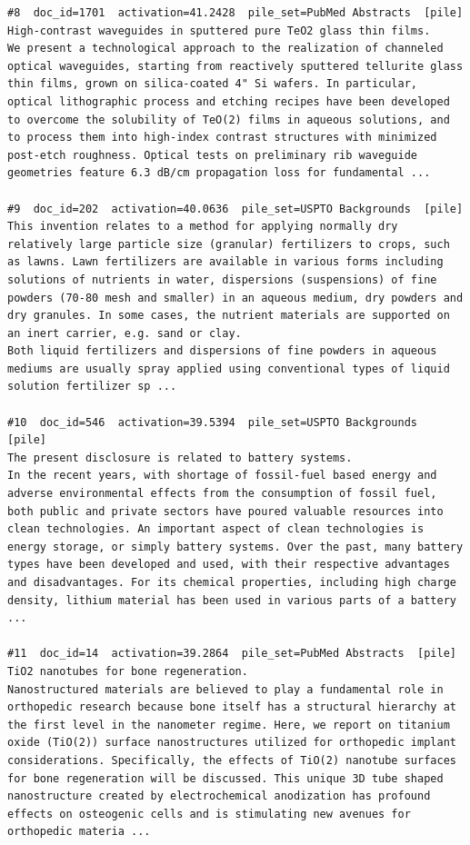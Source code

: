 \begin{verbatim}
#8  doc_id=1701  activation=41.2428  pile_set=PubMed Abstracts  [pile]
High-contrast waveguides in sputtered pure TeO2 glass thin films.
We present a technological approach to the realization of channeled optical waveguides, starting from reactively sputtered tellurite glass thin films, grown on silica-coated 4" Si wafers. In particular, optical lithographic process and etching recipes have been developed to overcome the solubility of TeO(2) films in aqueous solutions, and to process them into high-index contrast structures with minimized post-etch roughness. Optical tests on preliminary rib waveguide geometries feature 6.3 dB/cm propagation loss for fundamental ...

#9  doc_id=202  activation=40.0636  pile_set=USPTO Backgrounds  [pile]
This invention relates to a method for applying normally dry relatively large particle size (granular) fertilizers to crops, such as lawns. Lawn fertilizers are available in various forms including solutions of nutrients in water, dispersions (suspensions) of fine powders (70-80 mesh and smaller) in an aqueous medium, dry powders and dry granules. In some cases, the nutrient materials are supported on an inert carrier, e.g. sand or clay.
Both liquid fertilizers and dispersions of fine powders in aqueous mediums are usually spray applied using conventional types of liquid solution fertilizer sp ...

#10  doc_id=546  activation=39.5394  pile_set=USPTO Backgrounds  [pile]
The present disclosure is related to battery systems.
In the recent years, with shortage of fossil-fuel based energy and adverse environmental effects from the consumption of fossil fuel, both public and private sectors have poured valuable resources into clean technologies. An important aspect of clean technologies is energy storage, or simply battery systems. Over the past, many battery types have been developed and used, with their respective advantages and disadvantages. For its chemical properties, including high charge density, lithium material has been used in various parts of a battery ...

#11  doc_id=14  activation=39.2864  pile_set=PubMed Abstracts  [pile]
TiO2 nanotubes for bone regeneration.
Nanostructured materials are believed to play a fundamental role in orthopedic research because bone itself has a structural hierarchy at the first level in the nanometer regime. Here, we report on titanium oxide (TiO(2)) surface nanostructures utilized for orthopedic implant considerations. Specifically, the effects of TiO(2) nanotube surfaces for bone regeneration will be discussed. This unique 3D tube shaped nanostructure created by electrochemical anodization has profound effects on osteogenic cells and is stimulating new avenues for orthopedic materia ...


\end{verbatim}
